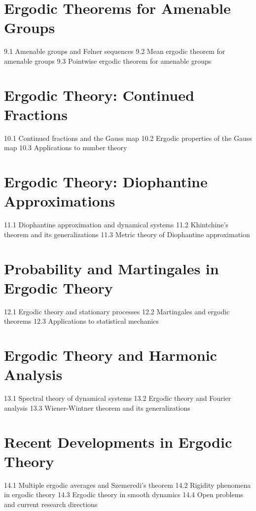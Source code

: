 \section{Ergodic Theorems for Amenable Groups}
9.1 Amenable groups and Følner sequences
9.2 Mean ergodic theorem for amenable groups
9.3 Pointwise ergodic theorem for amenable groups
\section{Ergodic Theory: Continued Fractions}
10.1 Continued fractions and the Gauss map
10.2 Ergodic properties of the Gauss map
10.3 Applications to number theory
\section{Ergodic Theory: Diophantine Approximations}
11.1 Diophantine approximation and dynamical systems
11.2 Khintchine's theorem and its generalizations
11.3 Metric theory of Diophantine approximation
\section{Probability and Martingales in Ergodic Theory}
12.1 Ergodic theory and stationary processes
12.2 Martingales and ergodic theorems
12.3 Applications to statistical mechanics
\section{Ergodic Theory and Harmonic Analysis}
13.1 Spectral theory of dynamical systems
13.2 Ergodic theory and Fourier analysis
13.3 Wiener-Wintner theorem and its generalizations
\section{Recent Developments in Ergodic Theory}
14.1 Multiple ergodic averages and Szemeredi's theorem
14.2 Rigidity phenomena in ergodic theory
14.3 Ergodic theory in smooth dynamics
14.4 Open problems and current research directions
